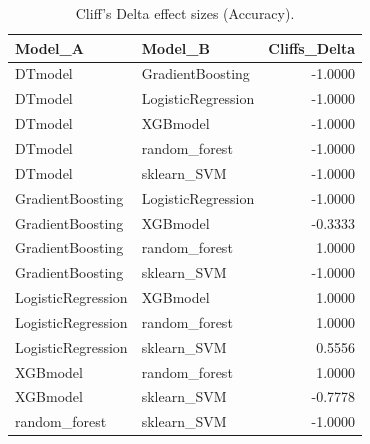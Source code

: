 \begin{table}[t]
\centering
\begin{tabular}{llr}
\toprule
Model_A & Model_B & Cliffs_Delta \\
\midrule
DTmodel & GradientBoosting & -1.0000 \\
DTmodel & LogisticRegression & -1.0000 \\
DTmodel & XGBmodel & -1.0000 \\
DTmodel & random_forest & -1.0000 \\
DTmodel & sklearn_SVM & -1.0000 \\
GradientBoosting & LogisticRegression & -1.0000 \\
GradientBoosting & XGBmodel & -0.3333 \\
GradientBoosting & random_forest & 1.0000 \\
GradientBoosting & sklearn_SVM & -1.0000 \\
LogisticRegression & XGBmodel & 1.0000 \\
LogisticRegression & random_forest & 1.0000 \\
LogisticRegression & sklearn_SVM & 0.5556 \\
XGBmodel & random_forest & 1.0000 \\
XGBmodel & sklearn_SVM & -0.7778 \\
random_forest & sklearn_SVM & -1.0000 \\
\bottomrule
\end{tabular}
\caption{Cliff's Delta effect sizes (Accuracy).}
\label{tab:cliffs_Accuracy}
\end{table}